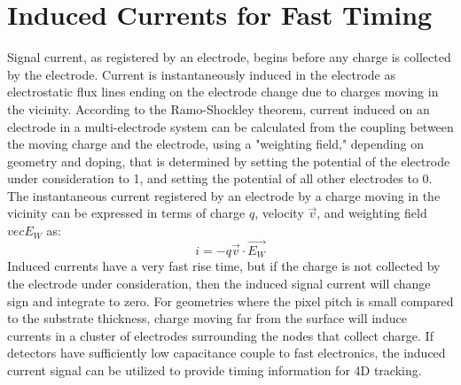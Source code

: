 \section{Induced Currents for Fast Timing}
Signal current, as registered by an electrode, begins before any charge is collected by the electrode.  
Current is instantaneously induced in the electrode as electrostatic flux lines ending on the electrode change due to charges moving in the vicinity.
According to the Ramo-Shockley theorem, current induced on an electrode in a multi-electrode system can be calculated from the coupling between the moving charge and the electrode, using a "weighting field," depending on geometry and doping, that is determined by setting the potential of the electrode under consideration to 1, and setting the potential of all other electrodes to 0.
The instantaneous current registered by an electrode by a charge moving in the vicinity can be expressed in terms of charge $q$, velocity $\vec{v}$, and weighting field $vec{E_W}$ as:
\begin{equation}
i = -q \vec{v} \cdot \vec{E_W}
\end{equation}
Induced currents have a very fast rise time, but if the charge is not collected by the electrode under consideration, then the induced signal current will change sign and integrate to zero.
For geometries where the pixel pitch is small compared to the substrate thickness, charge moving far from the surface will induce currents in a cluster of electrodes surrounding the nodes that collect charge.
If detectors have sufficiently low capacitance couple to fast electronics, the induced current signal can be utilized to provide timing information for 4D tracking.

